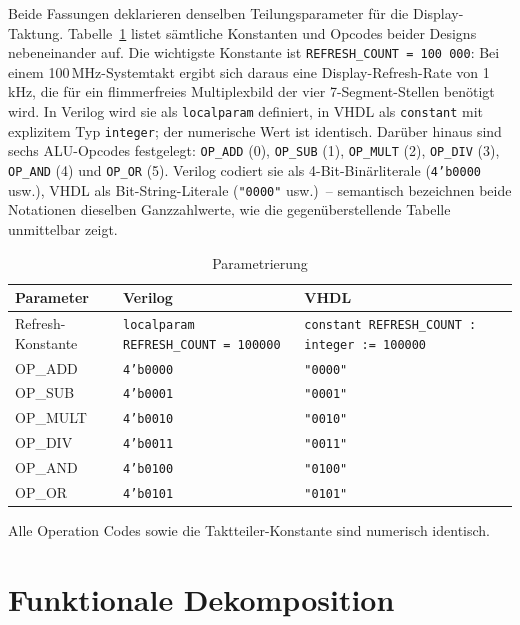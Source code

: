 ﻿\documentclass[12pt,a4paper]{report}
\begin{document}
Beide Fassungen deklarieren denselben Teilungsparameter für die
Display-Taktung.  Tabelle~\ref{tab:paras} listet sämtliche Konstanten
und Opcodes beider Designs nebeneinander auf.
Die wichtigste Konstante ist \texttt{REFRESH\_COUNT~=~100\,000}: Bei einem
100\,MHz-Systemtakt ergibt sich daraus eine Display-Refresh-Rate von 1\,kHz,
die für ein flimmerfreies Multiplexbild der vier 7-Segment-Stellen benötigt
wird.  In Verilog wird sie als \texttt{localparam} definiert, in VHDL als
\texttt{constant} mit explizitem Typ \texttt{integer}; der numerische Wert
ist identisch.  Darüber hinaus sind sechs ALU-Opcodes festgelegt:
\texttt{OP\_ADD} (0), \texttt{OP\_SUB} (1), \texttt{OP\_MULT} (2),
\texttt{OP\_DIV} (3), \texttt{OP\_AND} (4) und \texttt{OP\_OR} (5).
Verilog codiert sie als 4-Bit-Binärliterale (\texttt{4'b0000} usw.),
VHDL als Bit-String-Literale (\texttt{"0000"} usw.)~-- semantisch
bezeichnen beide Notationen dieselben Ganzzahlwerte, wie die
gegenüberstellende Tabelle unmittelbar zeigt.

\begin{table}
	\centering
	\begin{tabular}{|l|l|l|}
		\hline
		\textbf{Parameter} & \textbf{Verilog} & \textbf{VHDL} \\
		\hline
		Refresh-Konstante & \texttt{localparam REFRESH\_COUNT = 100000} & \texttt{constant REFRESH\_COUNT : integer := 100000} \\
		OP\_ADD  & \texttt{4'b0000} & \texttt{"0000"} \\
		OP\_SUB  & \texttt{4'b0001} & \texttt{"0001"} \\
		OP\_MULT & \texttt{4'b0010} & \texttt{"0010"} \\
		OP\_DIV  & \texttt{4'b0011} & \texttt{"0011"} \\
		OP\_AND  & \texttt{4'b0100} & \texttt{"0100"} \\
		OP\_OR   & \texttt{4'b0101} & \texttt{"0101"} \\
		\hline
	\end{tabular}
	\caption{Parametrierung}
	\label{tab:paras}
\end{table}

Alle Operation Codes sowie die Taktteiler-Konstante sind numerisch identisch.

\section{Funktionale Dekomposition}
\label{subsec:dekomposition}
\end{document}
